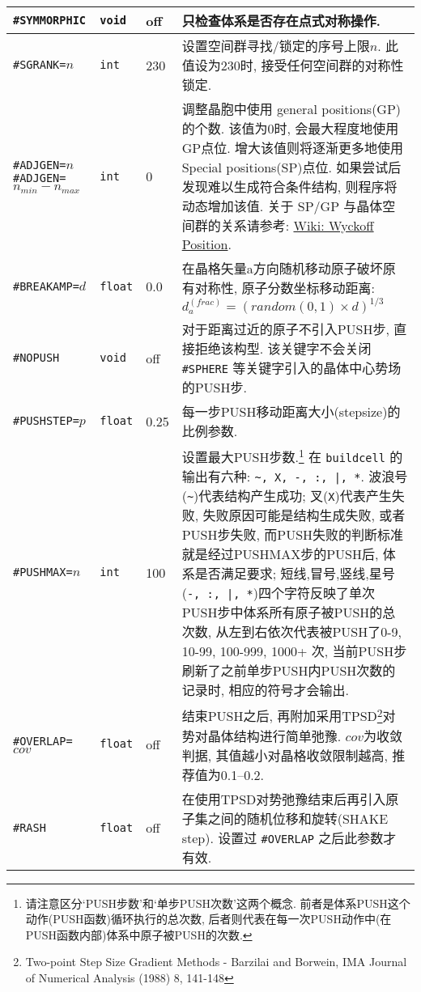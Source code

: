 \documentclass[a4paper, 10pt]{article}
\begin{document}
\begin{center}
\begin{longtable}{m{11em}|m{4em}<{\centering}|m{3em}<{\centering}|m{15em}}
\midrule
 \verb|#SYMMORPHIC| & \verb|void| & off & 只检查体系是否存在点式对称操作.\\
\midrule
 \verb|#SGRANK=|\(n\) & \verb|int| & 230 & 设置空间群寻找/锁定的序号上限\(n\). 此值设为230时, 接受任何空间群的对称性锁定.\\
\midrule
 \verb|#ADJGEN=|\(n\)\hspace{4em} \verb|#ADJGEN=|\(n_{min}-n_{max}\)  & \verb|int|  & 0 & 调整晶胞中使用 general positions(GP) 的个数. 该值为0时, 会最大程度地使用GP点位. 增大该值则将逐渐更多地使用 Special positions(SP)点位. 如果尝试后发现难以生成符合条件结构, 则程序将动态增加该值. 关于 SP/GP 与晶体空间群的关系请参考: \href{https://en.wikipedia.org/wiki/Wyckoff_positions}{Wiki: Wyckoff Position}.\\
\midrule
 \verb|#BREAKAMP=|\(d\) & \verb|float| & 0.0 & 在晶格矢量a方向随机移动原子破坏原有对称性, 原子分数坐标移动距离: \(d^{(frac)}_a=(random(0,1)\times{}d)^{1/3}\)\\
\midrule
 \verb|#NOPUSH|& \verb|void| & off & 对于距离过近的原子不引入PUSH步, 直接拒绝该构型. 该关键字不会关闭 \verb|#SPHERE| 等关键字引入的晶体中心势场的PUSH步.\\
\midrule
 \verb|#PUSHSTEP=|\(p\)& \verb|float| & 0.25 & 每一步PUSH移动距离大小(stepsize)的比例参数.\\
\midrule
 \verb|#PUSHMAX=|\(n\)& \verb|int| & 100 &设置最大PUSH步数.\footnote{请注意区分`PUSH步数'和`单步PUSH次数'这两个概念. 前者是体系PUSH这个动作(PUSH函数)循环执行的总次数, 后者则代表在每一次PUSH动作中(在PUSH函数内部)体系中原子被PUSH的次数.} 在 \verb|buildcell| 的输出有六种: \verb!~, X, -, :, |, *!. 波浪号(\verb|~|)代表结构产生成功; 叉(\verb|X|)代表产生失败, 失败原因可能是结构生成失败, 或者PUSH步失败, 而PUSH失败的判断标准就是经过PUSHMAX步的PUSH后, 体系是否满足要求; 短线,冒号,竖线,星号(\verb!-, :, |, *!)四个字符反映了单次PUSH步中体系所有原子被PUSH的总次数, 从左到右依次代表被PUSH了0-9, 10-99, 100-999, 1000+ 次, 当前PUSH步刷新了之前单步PUSH内PUSH次数的记录时, 相应的符号才会输出. \\
\midrule
 \verb|#OVERLAP=|\(cov\)& \verb|float| & off & 结束PUSH之后, 再附加采用TPSD\footnote{Two-point Step Size Gradient Methods - Barzilai and Borwein, IMA Journal of Numerical Analysis (1988) 8, 141-148}对势对晶体结构进行简单弛豫. \(cov\)为收敛判据, 其值越小对晶格收敛限制越高, 推荐值为0.1--0.2.\\
\midrule
 \verb|#RASH|& \verb|float| & off & 在使用TPSD对势弛豫结束后再引入原子集之间的随机位移和旋转(SHAKE step). 设置过 \verb|#OVERLAP| 之后此参数才有效.\\

\end{longtable}
\end{center}
\end{document}
